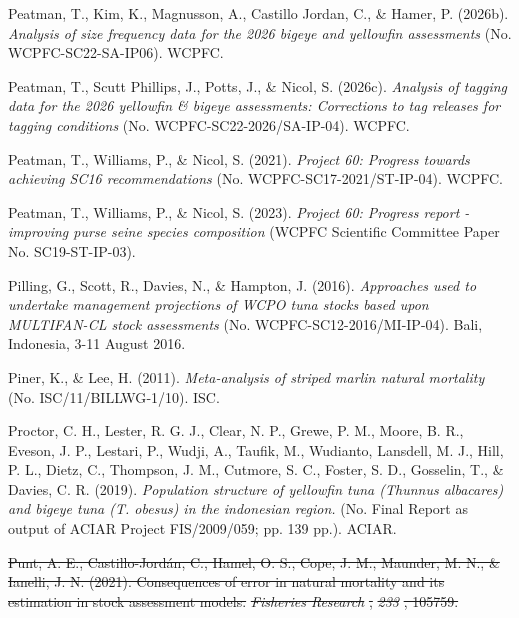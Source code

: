 \documentclass[
  english,
  a4paper,
  a4paper,
  11pt]{SCreport}
\newlength{\cslhangindent}
\newenvironment{CSLReferences}[2] %
 {\begin{list}{}{%
  \setlength{\itemindent}{0pt}
  \setlength{\leftmargin}{0pt}
  \setlength{\parsep}{0pt}
  \ifodd #1
   \setlength{\leftmargin}{\cslhangindent}
   \setlength{\itemindent}{-1\cslhangindent}
  \fi
  \setlength{\itemsep}{#2\baselineskip}}}
 {\end{list}}
\providecommand{\DIFdel}[1]{{\protect\color{red}\sout{#1}}}                      %
\providecommand{\DIFdelbegin}{} %
\newcommand{\DIFscaledelfig}{0.5}
\newlength{\DIFdelgraphicswidth} %
\newlength{\DIFdelgraphicsheight} %
\newcommand{\DIFdelincludegraphics}[2][]{%
\sbox{\DIFdelgraphicsbox}{\DIFOincludegraphics[#1]{#2}}%
\settoboxwidth{\DIFdelgraphicswidth}{\DIFdelgraphicsbox} %
\settoboxtotalheight{\DIFdelgraphicsheight}{\DIFdelgraphicsbox} %
\scalebox{\DIFscaledelfig}{%
\parbox[b]{\DIFdelgraphicswidth}{\usebox{\DIFdelgraphicsbox}\\[-\baselineskip] \rule{\DIFdelgraphicswidth}{0em}}\llap{\resizebox{\DIFdelgraphicswidth}{\DIFdelgraphicsheight}{%
\setlength{\unitlength}{\DIFdelgraphicswidth}%
\begin{picture}(1,1)%
\thicklines\linethickness{2pt} %
{\color[rgb]{1,0,0}\put(0,0){\framebox(1,1){}}}%
{\color[rgb]{1,0,0}\put(0,0){\line( 1,1){1}}}%
{\color[rgb]{1,0,0}\put(0,1){\line(1,-1){1}}}%
\end{picture}%
}\hspace*{3pt}}} %
} %
\DeclareRobustCommand{\DIFdelbegin}{\DIFOdelbegin \let\includegraphics\DIFdelincludegraphics} %
\begin{document}
\begin{CSLReferences}{1}{0}
Peatman, T., Kim, K., Magnusson, A., Castillo Jordan, C., \& Hamer, P.
(2026b). \emph{Analysis of size frequency data for the 2026 bigeye and
yellowfin assessments} (No. {WCPFC}-{SC}22-{SA}-{IP}06). WCPFC.

Peatman, T., Scutt Phillips, J., Potts, J., \& Nicol, S. (2026c).
\emph{Analysis of tagging data for the 2026 yellowfin \& bigeye
assessments: Corrections to tag releases for tagging conditions} (No.
{WCPFC}-{SC}22-2026/{SA}-{IP}-04). WCPFC.

Peatman, T., Williams, P., \& Nicol, S. (2021). \emph{Project 60:
Progress towards achieving {SC}16 recommendations} (No.
{WCPFC}-{SC}17-2021/{ST}-{IP}-04). WCPFC.

Peatman, T., Williams, P., \& Nicol, S. (2023). \emph{Project 60:
{Progress} report - improving purse seine species composition} (WCPFC
Scientific Committee Paper No. SC19-ST-IP-03).

Pilling, G., Scott, R., Davies, N., \& Hampton, J. (2016).
\emph{Approaches used to undertake management projections of {WCPO} tuna
stocks based upon {MULTIFAN}-{CL} stock assessments} (No.
{WCPFC}-{SC}12-2016/{MI}-{IP}-04). Bali, Indonesia, 3-11 August 2016.

Piner, K., \& Lee, H. (2011). \emph{Meta-analysis of striped marlin
natural mortality} (No. {ISC}/11/{BILLWG}‐1/10). ISC.

Proctor, C. H., Lester, R. G. J., Clear, N. P., Grewe, P. M., Moore, B.
R., Eveson, J. P., Lestari, P., Wudji, A., Taufik, M., Wudianto,
Lansdell, M. J., Hill, P. L., Dietz, C., Thompson, J. M., Cutmore, S.
C., Foster, S. D., Gosselin, T., \& Davies, C. R. (2019).
\emph{Population structure of yellowfin tuna ({\emph{Thunnus
albacares}}) and bigeye tuna ({\emph{T. obesus}}) in the indonesian
region.} (No. Final Report as output of {ACIAR} Project {FIS}/2009/059;
pp. 139 pp.). ACIAR.

\DIFdelbegin {}
\DIFdel{Punt, A. E., Castillo-Jordán, C., Hamel, O. S., Cope, J. M., Maunder, M.
N., \& Ianelli, J. N. (2021). Consequences of error in natural mortality
and its estimation in stock assessment models. }\emph{\DIFdel{Fisheries
Research}}%
\DIFdel{, }\emph{\DIFdel{233}}%
\DIFdel{, 105759.
}%


\end{CSLReferences}
\end{document}
